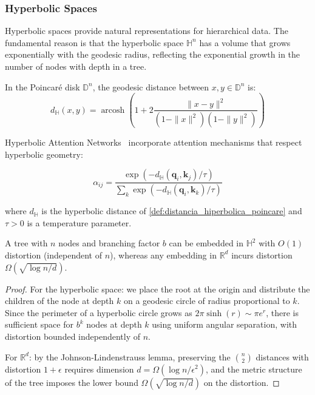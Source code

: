 \subsubsection{Hyperbolic Spaces}

Hyperbolic spaces provide natural representations for hierarchical data. The fundamental reason is that the hyperbolic space $\mathbb{H}^n$ has a volume that grows exponentially with the geodesic radius, reflecting the exponential growth in the number of nodes with depth in a tree.

\begin{definition}\label{def:distancia_hiperbolica_poincare}
In the Poincaré disk $\mathbb{D}^n$, the geodesic distance between $x, y \in \mathbb{D}^n$ is:
\begin{equation}
d_{\mathbb{H}}(x, y) = \operatorname{arcosh}\left(1 + 2\frac{\|x - y\|^2}{(1 - \|x\|^2)(1 - \|y\|^2)}\right)
\end{equation}
\end{definition}

Hyperbolic Attention Networks~\citep{gulcehre2019hyperbolic} incorporate attention mechanisms that respect hyperbolic geometry:

\begin{equation}
\alpha_{ij} = \frac{\exp(-d_{\mathbb{H}}(\mathbf{q}_i, \mathbf{k}_j)/\tau)}{\sum_{k} \exp(-d_{\mathbb{H}}(\mathbf{q}_i, \mathbf{k}_k)/\tau)}
\end{equation}

where $d_{\mathbb{H}}$ is the hyperbolic distance of \autoref{def:distancia_hiperbolica_poincare} and $\tau > 0$ is a temperature parameter.

\begin{proposition}\label{prop:capacidad_hiperbolica}
A tree with $n$ nodes and branching factor $b$ can be embedded in $\mathbb{H}^2$ with $O(1)$ distortion (independent of $n$), whereas any embedding in $\mathbb{R}^d$ incurs distortion $\Omega(\sqrt{\log n / d})$.
\end{proposition}

\begin{proof}
For the hyperbolic space: we place the root at the origin and distribute the children of the node at depth $k$ on a geodesic circle of radius proportional to $k$. Since the perimeter of a hyperbolic circle grows as $2\pi \sinh(r) \sim \pi e^r$, there is sufficient space for $b^k$ nodes at depth $k$ using uniform angular separation, with distortion bounded independently of $n$.

For $\mathbb{R}^d$: by the Johnson-Lindenstrauss lemma, preserving the $\binom{n}{2}$ distances with distortion $1 + \epsilon$ requires dimension $d = \Omega(\log n / \epsilon^2)$, and the metric structure of the tree imposes the lower bound $\Omega(\sqrt{\log n / d})$ on the distortion.
\end{proof}

